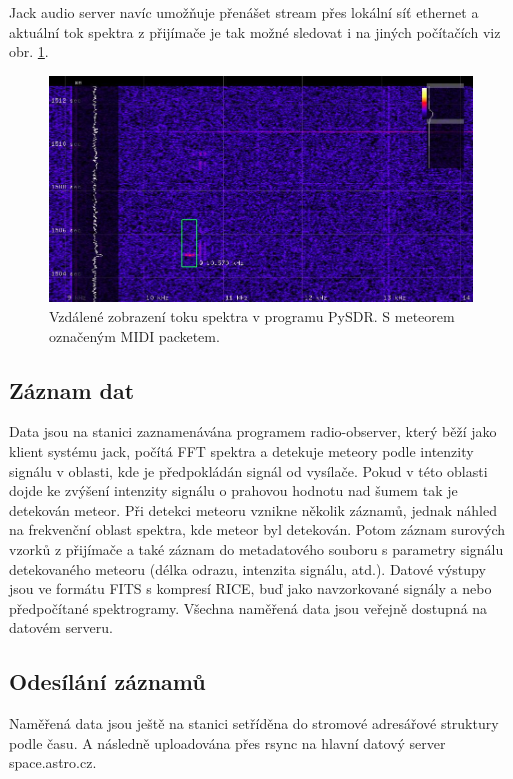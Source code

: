 \documentclass[12pt,a4paper,oneside]{article}
\begin{document}
Jack audio server navíc umožňuje přenášet stream přes lokální síť ethernet a aktuální tok spektra z přijímače je tak možné sledovat i na jiných počítačích viz obr. \ref{Pysdr}.

\begin{figure}[htbp]
\centering
\includegraphics [width=120mm] {./img/meteor_pysdr.jpg} 
\caption{Vzdálené zobrazení toku spektra v programu PySDR. S meteorem označeným MIDI packetem.}
\label{Pysdr}
\end{figure}

\subsection{Záznam dat}

Data jsou na stanici zaznamenávána programem radio-observer, který běží jako klient systému jack, počítá FFT spektra a detekuje meteory podle intenzity signálu v oblasti, kde je předpokládán signál od vysílače. Pokud v této oblasti dojde ke zvýšení intenzity signálu o prahovou hodnotu nad šumem tak je detekován meteor.  Při detekci meteoru vznikne několik záznamů, jednak náhled na frekvenční oblast spektra, kde meteor byl detekován. Potom záznam surových vzorků z přijímače a také záznam do metadatového souboru s parametry signálu detekovaného meteoru (délka odrazu, intenzita signálu, atd.). Datové výstupy jsou ve formátu FITS s kompresí RICE, buď jako navzorkované signály a nebo předpočítané spektrogramy. Všechna naměřená data jsou veřejně dostupná na datovém serveru. 

\subsection{Odesílání záznamů}

Naměřená data jsou ještě na stanici setříděna do stromové adresářové struktury podle času. A následně uploadována přes rsync na hlavní datový server space.astro.cz.
\end{document}
